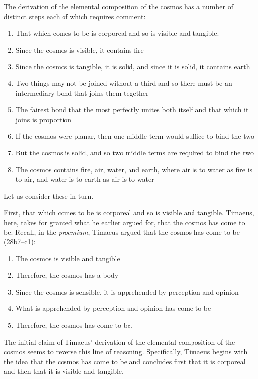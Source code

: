 The derivation of the elemental composition of the cosmos has a number of distinct steps each of which requires comment:
\begin{enumerate}
	\item That which comes to be is corporeal and so is visible and tangible.
	\item Since the cosmos is visible, it contains fire
	\item Since the cosmos is tangible, it is solid, and since it is solid, it contains earth
	\item Two things may not be joined without a third and so there must be an intermediary bond that joins them together
	\item The fairest bond that the most perfectly unites both itself and that which it joins is proportion
	\item If the cosmos were planar, then one middle term would suffice to bind the two
	\item But the cosmos is solid, and so two middle terms are required to bind the two
	\item The cosmos contains fire, air, water, and earth, where air is to water as fire is to air, and water is to earth as air is to water
\end{enumerate}
Let us consider these in turn.

First, that which comes to be is corporeal and so is visible and tangible. Timaeus, here, takes for granted what he earlier argued for, that the cosmos has come to be. Recall, in the \emph{proemium}, Timaeus argued that the cosmos has come to be (28b7--c1):
\begin{enumerate}
	\item The cosmos is visible and tangible
	\item Therefore, the cosmos has a body
	\item Since the cosmos is sensible, it is apprehended by perception and opinion
	\item What is apprehended by perception and opinion has come to be
	\item Therefore, the cosmos has come to be.
\end{enumerate}
The initial claim of Timaeus' derivation of the elemental composition of the cosmos seems to reverse this line of reasoning. Specifically, Timaeus begins with the idea that the cosmos has come to be and concludes first that it is corporeal and then that it is visible and tangible.

